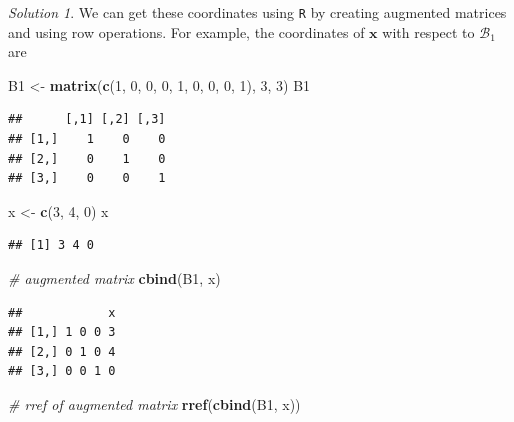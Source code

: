 \documentclass[
]{book}
\newenvironment{Shaded}{\begin{snugshade}}{\end{snugshade}}
\newcommand{\CommentTok}[1]{\textcolor[rgb]{0.56,0.35,0.01}{\textit{#1}}}
\newcommand{\DecValTok}[1]{\textcolor[rgb]{0.00,0.00,0.81}{#1}}
\newcommand{\KeywordTok}[1]{\textcolor[rgb]{0.13,0.29,0.53}{\textbf{#1}}}
\newcommand{\NormalTok}[1]{#1}
\newcommand{\StringTok}[1]{\textcolor[rgb]{0.31,0.60,0.02}{#1}}
\theoremstyle{definition}
\theoremstyle{definition}
\theoremstyle{definition}
\theoremstyle{definition}
\theoremstyle{remark}
\newtheorem*{solution}{Solution}
\begin{document}
\begin{solution}
We can get these coordinates using \texttt{R} by creating augmented matrices and using row operations. For example, the coordinates of \(\mathbf{x}\) with respect to \(\mathcal{B}_1\) are

\begin{Shaded}
\begin{Highlighting}[]
\NormalTok{B1 <-}\StringTok{ }\KeywordTok{matrix}\NormalTok{(}\KeywordTok{c}\NormalTok{(}\DecValTok{1}\NormalTok{, }\DecValTok{0}\NormalTok{, }\DecValTok{0}\NormalTok{, }\DecValTok{0}\NormalTok{, }\DecValTok{1}\NormalTok{, }\DecValTok{0}\NormalTok{, }\DecValTok{0}\NormalTok{, }\DecValTok{0}\NormalTok{, }\DecValTok{1}\NormalTok{), }\DecValTok{3}\NormalTok{, }\DecValTok{3}\NormalTok{)}
\NormalTok{B1}
\end{Highlighting}
\end{Shaded}

\begin{verbatim}
##      [,1] [,2] [,3]
## [1,]    1    0    0
## [2,]    0    1    0
## [3,]    0    0    1
\end{verbatim}

\begin{Shaded}
\begin{Highlighting}[]
\NormalTok{x <-}\StringTok{ }\KeywordTok{c}\NormalTok{(}\DecValTok{3}\NormalTok{, }\DecValTok{4}\NormalTok{, }\DecValTok{0}\NormalTok{)}
\NormalTok{x}
\end{Highlighting}
\end{Shaded}

\begin{verbatim}
## [1] 3 4 0
\end{verbatim}

\begin{Shaded}
\begin{Highlighting}[]
\CommentTok{# augmented matrix}
\KeywordTok{cbind}\NormalTok{(B1, x)}
\end{Highlighting}
\end{Shaded}

\begin{verbatim}
##            x
## [1,] 1 0 0 3
## [2,] 0 1 0 4
## [3,] 0 0 1 0
\end{verbatim}

\begin{Shaded}
\begin{Highlighting}[]
\CommentTok{# rref of augmented matrix}
\KeywordTok{rref}\NormalTok{(}\KeywordTok{cbind}\NormalTok{(B1, x))}
\end{Highlighting}
\end{Shaded}


\end{solution}
\end{document}
